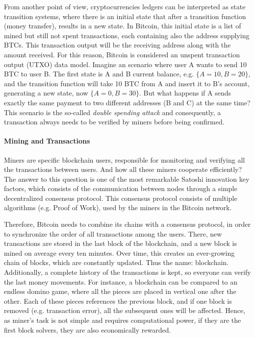 From another point of view, cryptocurrencies ledgers can be interpreted as state transition systems, where there is an initial state that after a transition function (money transfer), results in a new state. In Bitcoin, this initial state is a list of mined but still not spent transactions, each containing also the address supplying BTCs. This transaction output will be the receiving address along with the amount received. For this reason, Bitcoin is considered an unspent transaction output (UTXO) data model. Imagine an scenario where user A wants to send 10 BTC to user B. The first state is A and B current balance, e.g. $\{A = 10, B = 20\}$, and the transition function will take 10 BTC from A and insert it to B's account, generating a new state, now $\{A = 0, B = 30\}$. But what happens if A sends exactly the same payment to two different addresses (B and C) at the same time? This scenario is the so-called \textit{double spending attack} and consequently, a transaction always needs to be verified by miners before being confirmed. 

\paragraph{Mining and Transactions} \label{mining_Transactions}

Miners are specific blockchain users, responsible for monitoring and verifying all the transactions between users. And how all these miners cooperate efficiently? The answer to this question is one of the most remarkable Satoshi innovation key factors, which consists of the communication between nodes through a simple decentralized consensus protocol. This consensus protocol consists of multiple algorithms (e.g. Proof of Work), used by the miners in the Bitcoin network.

Therefore, Bitcoin needs to combine its chains with a consensus protocol, in order to synchronize the order of all transactions among the users. There, new transactions are stored in the last block of the blockchain, and a new block is mined on average every ten minutes. Over time, this creates an ever-growing chain of blocks, which are constantly updated. Thus the name: blockchain. Additionally, a complete history of the transactions is kept, so everyone can verify the last money movements. For instance, a blockchain can be compared to an endless domino game, where all the pieces are placed in vertical one after the other. Each of these pieces references the previous block, and if one block is removed (e.g. transaction error), all the subsequent ones will be affected. Hence, as miner's task is not simple and requires computational power, if they are the first block solvers, they are also economically rewarded.

